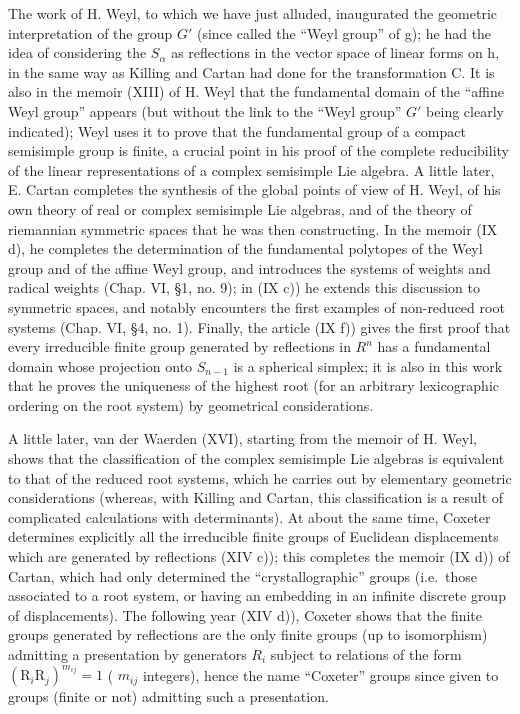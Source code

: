 The work of H. Weyl, to which we have just alluded, inaugurated the geometric interpretation of the group \(G'\) (since called the ``Weyl group'' of g); he had the idea of considering the \(S_{\alpha}\) as reflections in the vector space of linear forms on h, in the same way as Killing and Cartan had done for the transformation C. It is also in the memoir (XIII) of H. Weyl that the fundamental domain of the ``affine Weyl group'' appears (but without the link to the ``Weyl group'' \(G'\) being clearly indicated); Weyl uses it to prove that the fundamental group of a compact semisimple group is finite, a crucial point in his proof of the complete reducibility of the linear representations of a complex semisimple Lie algebra. A little later, E. Cartan completes the synthesis of the global points of view of H. Weyl, of his own theory of real or complex semisimple Lie algebras, and of the theory of riemannian symmetric spaces that he was then constructing. In the memoir (IX d), he completes the determination of the fundamental polytopes of the Weyl group and of the affine Weyl group, and introduces the systems of weights and radical weights (Chap. VI, §1, no. 9); in (IX c)) he extends this discussion to symmetric spaces, and notably encounters the first examples of non-reduced root systems (Chap. VI, §4, no. 1). Finally, the article (IX f)) gives the first proof that every irreducible finite group generated by reflections in \(R^{n}\) has a fundamental domain whose projection onto \(S_{n-1}\) is a spherical simplex; it is also in this work that he proves the uniqueness of the highest root (for an arbitrary lexicographic ordering on the root system) by geometrical considerations.

A little later, van der Waerden (XVI), starting from the memoir of H. Weyl, shows that the classification of the complex semisimple Lie algebras is equivalent to that of the reduced root systems, which he carries out by elementary geometric considerations (whereas, with Killing and Cartan, this classification is a result of complicated calculations with determinants). At about the same time, Coxeter determines explicitly all the irreducible finite groups of Euclidean displacements which are generated by reflections (XIV c)); this completes the memoir (IX d)) of Cartan, which had only determined the ``crystallographic'' groups (i.e.~those associated to a root system, or having an embedding in an infinite discrete group of displacements). The following year (XIV d)), Coxeter shows that the finite groups generated by reflections are the only finite groups (up to isomorphism) admitting a presentation by generators \(R_{i}\) subject to relations of the form \((\mathrm{R}_{i}\mathrm{R}_{j})^{m_{ij}} = 1\) ( \(m_{ij}\) integers), hence the name ``Coxeter'' groups since given to groups (finite or not) admitting such a presentation.

